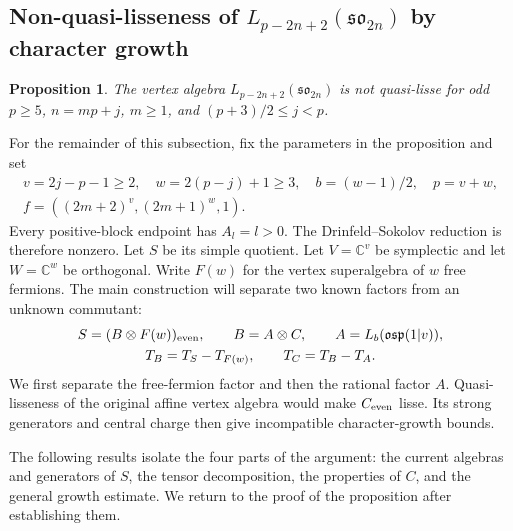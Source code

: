 \documentclass[11pt,a4paper]{amsart}
\numberwithin{equation}{section}
\newtheorem{proposition}[theorem]{Proposition}
\theoremstyle{definition}
\theoremstyle{remark}
\newcommand{\sog}{\mathfrak{so}}
\begin{document}
\subsection{\texorpdfstring{Non-quasi-lisseness of $L_{p-2n+2}(\sog_{2n})$ by character growth}{Non-quasi-lisseness of L(p-2n+2)(so(2n)) by character growth}}\label{seed:D-growth}
\begin{proposition}\label{seed:D-growth-result}
The vertex algebra $L_{p-2n+2}(\sog_{2n})$ is not quasi-lisse for odd
$p\ge5$, $n=mp+j$, $m\ge1$, and $(p+3)/2\le j<p$.
\end{proposition}

For the remainder of this subsection, fix the parameters in the
proposition and set
$$
 \begin{gathered}
 v=2j-p-1\ge2,\quad w=2(p-j)+1\ge3,\quad
 b=(w-1)/2,\quad p=v+w,\\
 f=((2m+2)^v,(2m+1)^w,1).
 \end{gathered}
$$
Every positive-block endpoint has $A_l=l>0$. The Drinfeld--Sokolov reduction is therefore nonzero. Let $S$ be its simple quotient.
Let $V=\mathbb C^v$ be symplectic and let $W=\mathbb C^w$ be
orthogonal. Write $F(w)$ for the vertex superalgebra of $w$ free fermions.
The main construction will separate two known factors from an unknown
commutant:
$$
 \begin{gathered}
 S=(B\otimes F(w))_{\rm even},\qquad
 B=A\otimes C,\qquad A=L_b(\mathfrak{osp}(1|v)),\\
 T_B=T_S-T_{F(w)},\qquad T_C=T_B-T_A.
 \end{gathered}
$$
We first separate the free-fermion factor and then the rational factor $A$. Quasi-lisseness of
the original affine vertex algebra would make $C_{\rm even}$ lisse.
Its strong generators and central charge then give incompatible
character-growth bounds.

The following results isolate the four parts of the argument: the
current algebras and generators of $S$, the tensor decomposition, the
properties of $C$, and the general growth estimate. We return to the
proof of the proposition after establishing them.
\end{document}
